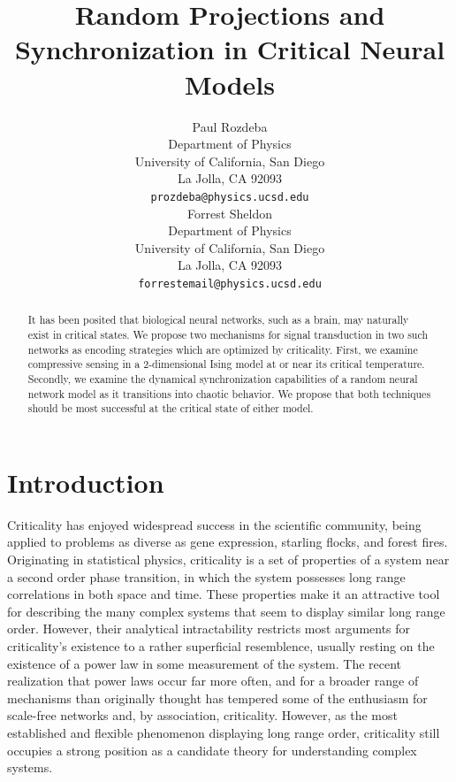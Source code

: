 \documentclass{article} %
\title{Random Projections and Synchronization in Critical Neural Models}
\author{
Paul Rozdeba%
\\
Department of Physics\\
University of California, San Diego\\
La Jolla, CA 92093 \\
\texttt{prozdeba@physics.ucsd.edu} \\
\And
Forrest Sheldon \\
Department of Physics\\
University of California, San Diego\\
La Jolla, CA 92093 \\
\texttt{forrestemail@physics.ucsd.edu} \\
}
\begin{document}
\maketitle

\begin{abstract}
It has been posited that biological neural networks, such as a brain, may naturally exist in critical states.  We propose two mechanisms for signal transduction in two such networks as encoding strategies which are optimized by criticality.  First, we examine compressive sensing in a 2-dimensional Ising model at or near its critical temperature.  Secondly, we examine the dynamical synchronization capabilities of a random neural network model as it transitions into chaotic behavior.  We propose that both techniques should be most successful at the critical state of either model.
\end{abstract}

\section{Introduction}
Criticality has enjoyed widespread success in the scientific community, being
applied to problems as diverse as gene expression, starling flocks, and forest
fires.\cite{Chialvo2010}  Originating in statistical physics, criticality is a set
of properties of a system near a second order phase transition, in which the
system possesses long range correlations in both space and time.  These
properties make it an attractive tool for describing the many complex systems
that seem to display similar long range order.  However, their analytical
intractability restricts most arguments for criticality's existence to a
rather superficial resemblence, usually resting on the existence of a power
law in some measurement of the system. The recent realization that power laws
occur far more often, and for a broader range of mechanisms than originally
thought has tempered some of the enthusiasm for scale-free networks and, by
association, criticality.\cite{Keller2005} However, as the most established and
flexible phenomenon displaying long range order, criticality still occupies
a strong position as a candidate theory for understanding complex systems.
\end{document}
